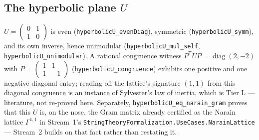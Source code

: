 \documentclass[11pt,a4paper]{article}
\theoremstyle{remark}
\newcommand{\tierL}{\colorbox{blue!10}{\textsf{\scriptsize Tier L --- literature}}}
\begin{document}
\subsection{The hyperbolic plane $U$}
$U=\begin{pmatrix}0&1\\1&0\end{pmatrix}$ is even (\texttt{hyperbolicU\_evenDiag}), symmetric
(\texttt{hyperbolicU\_symm}), and its own inverse, hence unimodular
(\texttt{hyperbolicU\_mul\_self}, \texttt{hyperbolicU\_unimodular}). A rational congruence witness
$P^{\mathsf T}UP=\operatorname{diag}(2,-2)$ with $P=\begin{pmatrix}1&1\\1&-1\end{pmatrix}$
(\texttt{hyperbolicU\_congruence}) exhibits one positive and one negative diagonal entry; reading
off the lattice's signature $(1,1)$ from this diagonal congruence is an instance of Sylvester's
law of inertia, which is \tierL, not re-proved here. Separately,
\texttt{hyperbolicU\_eq\_narain\_gram} proves that this $U$ is, on the nose, the Gram matrix
already certified as the Narain lattice $\Gamma^{1,1}$ in Stream~1's
\texttt{StringTheoryFormalization.UseCases.NarainLattice} --- Stream~2 builds on that fact rather
than restating it.
\end{document}
